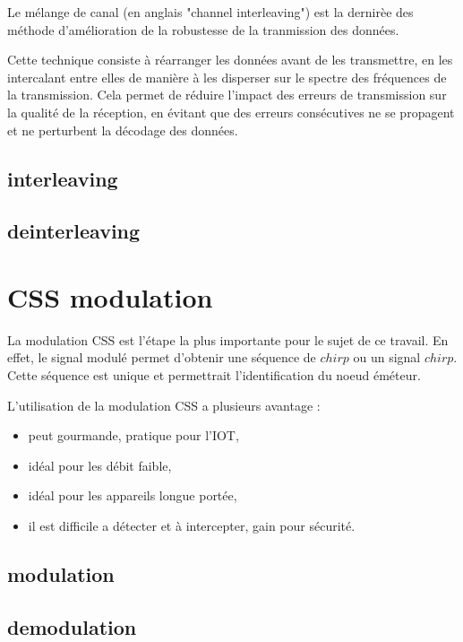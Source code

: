 \documentclass[12pt,a4paper,oneside, titlepage]{report}
\begin{document}
Le mélange de canal (en anglais "channel interleaving") est la dernirèe des méthode d'amélioration de la robustesse de la tranmission des données. 

Cette technique consiste à réarranger les données avant de les transmettre, en les intercalant entre elles de manière à les disperser sur le spectre des fréquences de la transmission. Cela permet de réduire l'impact des erreurs de transmission sur la qualité de la réception, en évitant que des erreurs consécutives ne se propagent et ne perturbent la décodage des données.

\subsection{interleaving}

\subsection{deinterleaving}

\section{CSS modulation}

La modulation CSS est l'étape la plus importante pour le sujet de ce travail. En effet, le signal modulé permet d'obtenir une séquence de $chirp$ ou un signal $chirp$. Cette séquence est unique et permettrait l'identification du noeud éméteur. 

L'utilisation de la modulation CSS a plusieurs avantage :

\begin{itemize}
\item peut gourmande, pratique pour l'IOT,
\item idéal pour les débit faible,
\item idéal pour les appareils longue portée,
\item il est difficile a détecter et à intercepter, gain pour sécurité.
\end{itemize}

\subsection{modulation}

\subsection{demodulation}
\end{document}
